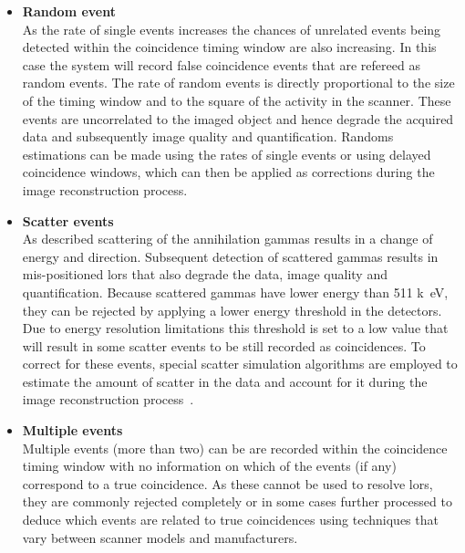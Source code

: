 \begin{itemize}

\item\textbf{Random event}\\
As the rate of single events increases the chances of unrelated events being detected within the coincidence timing window are also increasing. In this case the system will record false coincidence events that are refereed as random events. 
The rate of random events is directly proportional to the size of the timing window and to the square of the activity in the scanner. These events are uncorrelated to the imaged object and hence degrade the acquired data and subsequently image quality and quantification.  
Randoms estimations can be made using the rates of single events or using delayed coincidence windows, which can then be applied as corrections during the image reconstruction process. 

\item\textbf{Scatter events}\\
As described scattering of the annihilation gammas results in a change of energy and direction. Subsequent detection of scattered gammas results in mis-positioned \glspl{lor} that also degrade the data, image quality and quantification. 
Because scattered gammas have lower energy than 511 \si{k\electronvolt}, they can be rejected by applying a lower energy threshold in the detectors. Due to energy resolution limitations this threshold is set to a low value that will result in some scatter events to be still recorded as coincidences. 
To correct for these events, special scatter simulation algorithms are employed to estimate the amount of scatter in the data and account for it during the image reconstruction process~\cite{Polycarpou2011}. 

\item\textbf{Multiple events}\\
Multiple events (more than two) can be are recorded within the coincidence timing window with no information on which of the events (if any) correspond to a true coincidence. As these cannot be used to resolve \glspl{lor}, they are commonly rejected completely or in some cases further processed to deduce which events are related to true coincidences using techniques that vary between scanner models and manufacturers. 
\end{itemize}
%

